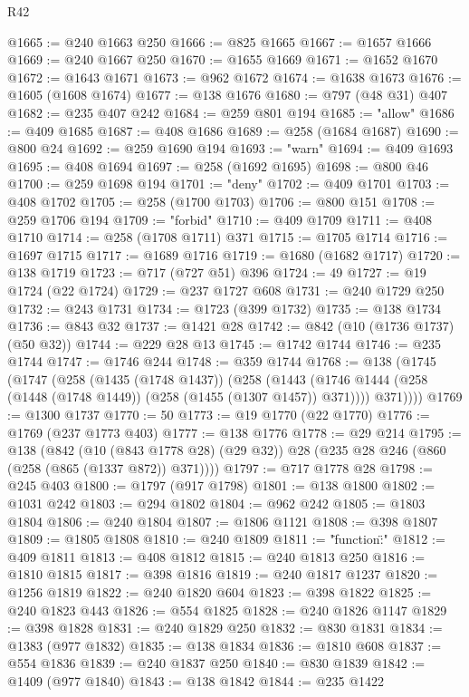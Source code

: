 \begin{lexlean}{R42}
\begin{coremodule}
@1665 := @240 @1663 @250
@1666 := @825 @1665
@1667 := @1657 @1666
@1669 := @240 @1667 @250
@1670 := @1655 @1669
@1671 := @1652 @1670
@1672 := @1643 @1671
@1673 := @962 @1672
@1674 := @1638 @1673
@1676 := @1605 (@1608 @1674)
@1677 := @138 @1676
@1680 := @797 (@48 @31) @407
@1682 := @235 @407 @242
@1684 := @259 @801 @194
@1685 := "allow"
@1686 := @409 @1685
@1687 := @408 @1686
@1689 := @258 (@1684 @1687)
@1690 := @800 @24
@1692 := @259 @1690 @194
@1693 := "warn"
@1694 := @409 @1693
@1695 := @408 @1694
@1697 := @258 (@1692 @1695)
@1698 := @800 @46
@1700 := @259 @1698 @194
@1701 := "deny"
@1702 := @409 @1701
@1703 := @408 @1702
@1705 := @258 (@1700 @1703)
@1706 := @800 @151
@1708 := @259 @1706 @194
@1709 := "forbid"
@1710 := @409 @1709
@1711 := @408 @1710
@1714 := @258 (@1708 @1711) @371
@1715 := @1705 @1714
@1716 := @1697 @1715
@1717 := @1689 @1716
@1719 := @1680 (@1682 @1717)
@1720 := @138 @1719
@1723 := @717 (@727 @51) @396
@1724 := 49
@1727 := @19 @1724 (@22 @1724)
@1729 := @237 @1727 @608
@1731 := @240 @1729 @250
@1732 := @243 @1731
@1734 := @1723 (@399 @1732)
@1735 := @138 @1734
@1736 := @843 @32
@1737 := @1421 @28
@1742 := @842 (@10 (@1736 @1737) (@50 @32))
@1744 := @229 @28 @13
@1745 := @1742 @1744
@1746 := @235 @1744
@1747 := @1746 @244
@1748 := @359 @1744
@1768 := @138
    (@1745
      (@1747
        (@258
          (@1435 (@1748 @1437))
          (@258
            (@1443 (@1746 @1444 (@258 (@1448 (@1748 @1449)) (@258 (@1455 (@1307 @1457)) @371))))
            @371))))
@1769 := @1300 @1737
@1770 := 50
@1773 := @19 @1770 (@22 @1770)
@1776 := @1769 (@237 @1773 @403)
@1777 := @138 @1776
@1778 := @29 @214
@1795 := @138
    (@842
      (@10 (@843 @1778 @28) (@29 @32))
      @28
      (@235 @28 @246 (@860 (@258 (@865 (@1337 @872)) @371))))
@1797 := @717 @1778 @28
@1798 := @245 @403
@1800 := @1797 (@917 @1798)
@1801 := @138 @1800
@1802 := @1031 @242
@1803 := @294 @1802
@1804 := @962 @242
@1805 := @1803 @1804
@1806 := @240 @1804
@1807 := @1806 @1121
@1808 := @398 @1807
@1809 := @1805 @1808
@1810 := @240 @1809
@1811 := "{\"function\":"
@1812 := @409 @1811
@1813 := @408 @1812
@1815 := @240 @1813 @250
@1816 := @1810 @1815
@1817 := @398 @1816
@1819 := @240 @1817 @1237
@1820 := @1256 @1819
@1822 := @240 @1820 @604
@1823 := @398 @1822
@1825 := @240 @1823 @443
@1826 := @554 @1825
@1828 := @240 @1826 @1147
@1829 := @398 @1828
@1831 := @240 @1829 @250
@1832 := @830 @1831
@1834 := @1383 (@977 @1832)
@1835 := @138 @1834
@1836 := @1810 @608
@1837 := @554 @1836
@1839 := @240 @1837 @250
@1840 := @830 @1839
@1842 := @1409 (@977 @1840)
@1843 := @138 @1842
@1844 := @235 @1422
}
\end{coremodule}
\end{lexlean}
